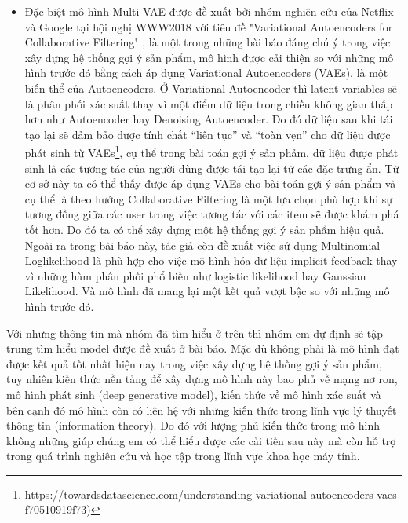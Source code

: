 \documentclass{article}[14pt]
\begin{document}
{\begin{itemize}
{   đó thì sẽ khó để tìm được sự tương đồng giữa các user trong việc tương tác 
   với item đó}; Bên cạnh đó có thể kể đến “Collaborative Denoising 
   Auto-Encoders for Top-N Recommender Systems” \cite{cde} nói về mô hình CDE 
   được đề xuất bởi nhóm nghiên cứu tại trường đại học Beihang, Trung Quốc, 
   cũng là một bài báo nổi bật trong việc áp dụng mô hình Autoencoders, mô hình 
   này sử dụng một biến thể của Autoencoders là Denoising Autoencoder để xây 
   dựng hệ thống gợi ý sản phẩm, điểm khác biệt của mô hình CDE là input của mô 
   hình sẽ được thêm nhiễu nhằm giúp mô hình tránh tình trạng overfitting. Và 
   theo bài báo thì CDE có được kết quả tốt nhất trên những tập dữ liệu được thực nghiệm
   tại thời điểm được đề xuất.
\item	Đặc biệt mô hình Multi-VAE được đề xuất bởi nhóm nghiên cứu của Netflix và 
Google tại hội nghị WWW2018 với tiêu đề "Variational Autoencoders for 
Collaborative Filtering" \cite{mvae}, là một trong những bài báo đáng chú ý trong việc xây 
dựng hệ thống gợi ý sản phẩm, mô hình được cải thiện so với những mô hình trước 
đó bằng cách áp dụng Variational Autoencoders (VAEs), là một biến thể của 
Autoencoders. Ở Variational Autoencoder thì latent variables sẽ là phân phối xác 
suất thay vì một điểm dữ liệu trong chiều không gian thấp hơn như Autoencoder 
hay Denoising Autoencoder. Do đó dữ liệu sau khi tái tạo lại sẽ đảm bảo được 
tính chất “liên tục” và “toàn vẹn” cho dữ liệu được phát sinh từ VAEs\footnote{https://towardsdatascience.com/understanding-variational-autoencoders-vaes-f70510919f73)},
cụ thể trong bài toán gợi ý sản phảm, dữ liệu được phát sinh là các tương tác của người dùng được tái tạo lại từ các đặc trưng ẩn.
Từ cơ sở này ta có thể thấy được áp dụng VAEs cho bài toán gợi ý sản phẩm và cụ 
thể là theo hướng Collaborative Filtering là một lựa chọn phù hợp khi sự tương 
đồng giữa các user trong việc tương tác với các item sẽ được khám phá tốt hơn. 
Do đó ta có thể xây dựng một hệ thống gợi ý sản phẩm hiệu quả. Ngoài ra trong 
bài báo này, tác giả còn đề xuất việc sử dụng Multinomial Loglikelihood là phù 
hợp cho việc mô hình hóa dữ liệu implicit feedback thay vì những hàm phân phối 
phổ biến như logistic likelihood hay Gaussian Likelihood. Và mô hình đã mang 
lại một kết quả vượt bậc so với những mô hình trước đó.

\end{itemize}
Với những thông tin mà nhóm đã tìm hiểu ở trên thì nhóm em dự định sẽ tập trung 
tìm hiểu model được đề xuất ở bài báo. Mặc dù không phải là mô hình đạt 
được kết quả tốt nhất hiện nay trong việc xây dựng hệ thống gợi ý sản phẩm, tuy 
nhiên kiến thức nền tảng để xây dựng mô hình này bao phủ về mạng nơ ron, mô 
hình phát sinh (deep generative model), kiến thức về mô hình xác suất và bên cạnh đó
mô hình còn có liên hệ với những kiến thức trong lĩnh vực lý thuyết thông tin (information theory).
Do đó với lượng phủ kiến thức trong mô hình không những giúp 
chúng em có thể hiểu được các cải tiến sau này mà còn hỗ trợ trong quá trình nghiên cứu 
và học tập trong lĩnh vực khoa học máy tính.
   
}
\end{document}
